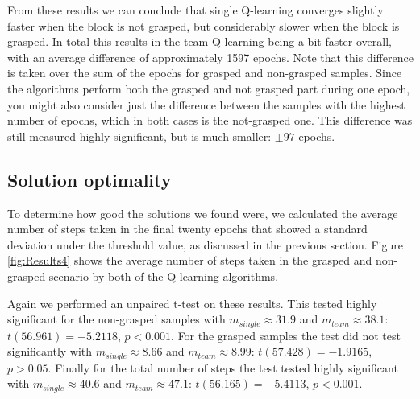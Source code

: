 From these results we can conclude that single Q-learning converges slightly faster when the block is not grasped, but considerably slower when the block is grasped. In total this results in the team Q-learning being a bit faster overall, with an average difference of approximately 1597 epochs. Note that this difference is taken over the sum of the epochs for grasped and non-grasped samples. Since the algorithms perform both the grasped and not grasped part during one epoch, you might also consider just the difference between the samples with the highest number of epochs, which in both cases is the not-grasped one. This difference was still measured highly significant, but is much smaller: $\pm 97$ epochs.

\subsection{Solution optimality}
To determine how good the solutions we found were, we calculated the average number of steps taken in the final twenty epochs that showed a standard deviation under the threshold value, as discussed in the previous section. Figure \ref{fig:Results4} shows the average number of steps taken in the grasped and non-grasped scenario by both of the Q-learning algorithms.

Again we performed an unpaired t-test on these results. This tested highly significant for the non-grasped samples with $m_{single} \approx 31.9$ and $m_{team} \approx 38.1$: $t(56.961) = -5.2118$, $p < 0.001$. For the grasped samples the test did not test significantly with $m_{single} \approx 8.66$ and $m_{team} \approx 8.99$: $t(57.428) = -1.9165$, $p > 0.05$. Finally for the total number of steps the test tested highly significant with $m_{single} \approx 40.6$ and $m_{team} \approx 47.1$: $t(56.165) = -5.4113$, $p < 0.001$.

